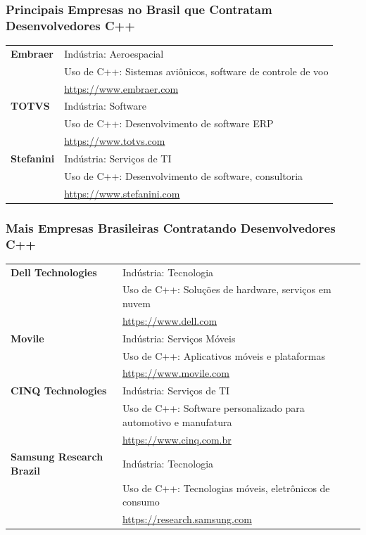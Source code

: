 \documentclass[aspectratio=169]{beamer}
\begin{document}
\begin{frame}
    \frametitle{Principais Empresas no Brasil que Contratam Desenvolvedores C++}

    \small
    \begin{tabular}{p{} p{}}
        \textbf{Embraer} & 
        Indústria: Aeroespacial \\
        & Uso de C++: Sistemas aviônicos, software de controle de voo \\
        &  \url{https://www.embraer.com} \\ \hline
        
        \textbf{TOTVS} & 
        Indústria: Software \\
        & Uso de C++: Desenvolvimento de software ERP \\
        & \url{https://www.totvs.com} \\ \hline
        
        
        \textbf{Stefanini} & 
        Indústria: Serviços de TI \\
        & Uso de C++: Desenvolvimento de software, consultoria \\
        &  \url{https://www.stefanini.com} \\
    \end{tabular}
\end{frame}

\begin{frame}
    \frametitle{Mais Empresas Brasileiras Contratando Desenvolvedores C++}

    \small
    \begin{tabular}{p{} p{}}
        \textbf{Dell Technologies} & 
        Indústria: Tecnologia \\
        & Uso de C++: Soluções de hardware, serviços em nuvem \\
        & \url{https://www.dell.com} \\ \hline
        
        \textbf{Movile} & 
        Indústria: Serviços Móveis \\
        & Uso de C++: Aplicativos móveis e plataformas \\
        &  \url{https://www.movile.com} \\ \hline
        
        \textbf{CINQ Technologies} & 
        Indústria: Serviços de TI \\
        & Uso de C++: Software personalizado para automotivo e manufatura \\
        & \url{https://www.cinq.com.br} \\ \hline
        
        \textbf{Samsung Research Brazil} & 
        Indústria: Tecnologia \\
        & Uso de C++: Tecnologias móveis, eletrônicos de consumo \\
        & \url{https://research.samsung.com} \\
    \end{tabular}
\end{frame}
\end{document}

